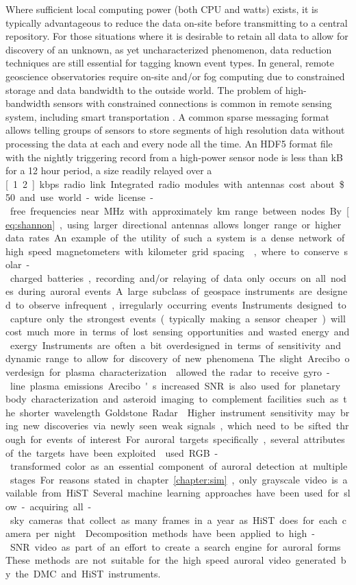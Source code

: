 Where sufficient local computing power (both CPU and watts) exists, it is typically advantageous to reduce the data on-site before transmitting to a central repository.
For those situations where it is desirable to retain all data to allow for discovery of an unknown, as yet uncharacterized phenomenon, data reduction techniques are still essential for tagging known event types.
In general, remote geoscience observatories require on-site and/or fog computing due to constrained storage and data bandwidth to the outside world.
The problem of high-bandwidth sensors with constrained connections is common in remote sensing system, including smart transportation \citep{hou2016}.
A common sparse messaging format allows telling groups of sensors to store segments of high resolution data without processing the data at each and every node all the time.
An HDF5 format file with the nightly triggering record from a high-power sensor node is less than \unit[25]{kB} for a 12 hour period, a size readily relayed over a \unit[1.2]{kbps} radio link.
Integrated radio modules with antennas cost about \$50 and use world-wide license-free frequencies near \unit[900]{MHz} with approximately \unit[1]{km} range between nodes.
By \eqref{eq:shannon}, using larger directional antennas allows longer range or higher data rates.
An example of the utility of such a system is a dense network of high speed magnetometers with kilometer grid spacing \citep{raeder2016}, where to conserve solar-charged batteries, recording and/or relaying of data only occurs on all nodes during auroral events.

A large subclass of geospace instruments are designed to observe infrequent, irregularly occurring events.
Instruments designed to capture only the strongest events (typically making a sensor cheaper) will cost much more in terms of lost sensing opportunities and wasted energy and exergy.
Instruments are often a bit overdesigned in terms of sensitivity and dynamic range to allow for discovery of new phenomena.
The slight Arecibo overdesign for plasma characterization \citep{farley2012} allowed the radar to receive gyro-line plasma emissions. 
Arecibo's increased SNR is also used for planetary body characterization and asteroid imaging to complement facilities such as the shorter wavelength Goldstone Radar \citep{slade2011}.
Higher instrument sensitivity may bring new discoveries via newly seen weak signals, which need to be sifted through for events of interest.

For auroral targets specifically, several attributes of the targets have been exploited.
\citet{rao2014} used RGB-transformed color as an essential component of auroral detection at multiple stages.
For reasons stated in chapter~\ref{chapter:sim}, only grayscale video is available from HiST.
Several machine learning approaches have been used for slow-acquiring all-sky cameras that collect as many frames in a year as HiST does for each camera per night \citep{mikka2005}.
Decomposition methods have been applied to high-SNR video as part of an effort to create a search engine for auroral forms \citep{mikka2002}.
These methods are not suitable for the high speed auroral video generated by the DMC and HiST instruments.

